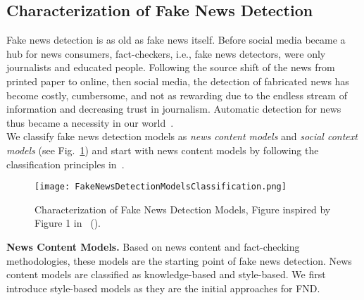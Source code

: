 \subsection{Characterization of Fake News Detection}
\label{subsec:FakeNewsDetection_Characterization}
Fake news detection is as old as fake news itself. Before social media became a hub for news consumers, fact-checkers, i.e., fake news detectors, were only journalists and educated people. Following the source shift of the news from printed paper to online, then social media, the detection of fabricated news has become costly, cumbersome, and not as rewarding due to the endless stream of information and decreasing trust in journalism. Automatic detection for news thus became a necessity in our world~\parencite{NewsInAnOnlineWorld_Chen}.\\
We classify fake news detection models as \emph{news content models} and  \emph{social context models} (see Fig.~\ref{fig:FakeNewsDetectionModelsClassification}) and start with news content models by following the classification principles in~\parencite{FakeNewsDetectionOnSocialMediaADataMiningPerspective_Shu}.\\
\begin{figure}
    \centering
    \texttt{[image: FakeNewsDetectionModelsClassification.png]}
    \caption[Characterization of Fake News Detection Models]{Characterization of Fake News Detection Models, Figure inspired by Figure 1 in~\citeauthor{FakeNewsDetectionOnSocialMediaADataMiningPerspective_Shu} (\citeyear{FakeNewsDetectionOnSocialMediaADataMiningPerspective_Shu}).}
    \label{fig:FakeNewsDetectionModelsClassification}
\end{figure}
\textbf{News Content Models.} Based on news content and fact-checking methodologies, these models are the starting point of fake news detection. News content models are classified as knowledge-based and style-based. We first introduce style-based models as they are the initial approaches for FND.
